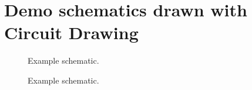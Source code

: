 \documentclass[a4paper, 11pt]{article}
\begin{document}
\section*{Demo schematics drawn with Circuit Drawing}

\begin{figure}[htbp]
\centering

\caption{Example schematic.}
\end{figure}

\begin{figure}[htbp]
\centering
\def\scaleSchematic{1.1} %

\caption{Example schematic.}
\end{figure}
\end{document}

